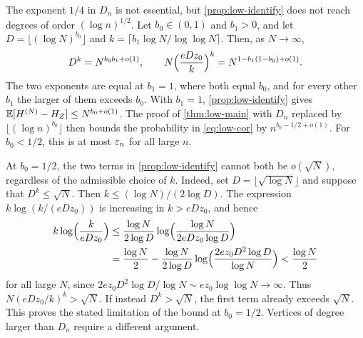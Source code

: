 \begin{remark}\label{rem:low-limit}
The exponent $1/4$ in $D_n$ is not essential, but \cref{prop:low-identify} does not reach degrees of order $(\log n)^{1/2}$. Let $b_0 \in (0, 1)$ and $b_1 > 0$, and let $D = \lfloor (\log N)^{b_0} \rfloor$ and $k = \lceil b_1 \log N/\log \log N \rceil$. Then, as $N \to \infty$,
\begin{equation*}
D^k = N^{b_0 b_1 + o(1)}, \qquad N \Bigl(\frac{e D z_0}{k}\Bigr)^k = N^{1 - b_1 (1 - b_0) + o(1)}.
\end{equation*}
The two exponents are equal at $b_1 = 1$, where both equal $b_0$, and for every other $b_1$ the larger of them exceeds $b_0$. With $b_1 = 1$, \cref{prop:low-identify} gives $\mathbb E[H^{(N)} - H_Z] \le N^{b_0 + o(1)}$. The proof of \cref{thm:low-main} with $D_n$ replaced by $\lfloor (\log n)^{b_0} \rfloor$ then bounds the probability in \eqref{eq:low-cor} by $n^{b_0 - 1/2 + o(1)}$. For $b_0 < 1/2$, this is at most $\varepsilon_n$ for all large $n$.

At $b_0 = 1/2$, the two terms in \cref{prop:low-identify} cannot both be $o(\sqrt N)$, regardless of the admissible choice of $k$. Indeed, set $D = \lfloor \sqrt{\log N} \rfloor$ and suppose that $D^k \le \sqrt N$. Then $k \le (\log N)/(2 \log D)$. The expression $k \log(k/(e D z_0))$ is increasing in $k > e D z_0$, and hence
\[
\begin{split}
k \log\Bigl(\frac{k}{e D z_0}\Bigr)
&\le \frac{\log N}{2 \log D}
\log\Bigl(\frac{\log N}{2 e D z_0 \log D}\Bigr) \\
&= \frac{\log N}{2}
- \frac{\log N}{2 \log D}
\log\Bigl(\frac{2 e z_0 D^2 \log D}{\log N}\Bigr)
< \frac{\log N}{2}
\end{split}
\]
for all large $N$, since $2 e z_0 D^2 \log D/\log N \sim e z_0 \log\log N \to \infty$. Thus $N(e D z_0/k)^k > \sqrt N$. If instead $D^k > \sqrt N$, the first term already exceeds $\sqrt N$. This proves the stated limitation of the bound at $b_0 = 1/2$. Vertices of degree larger than $D_n$ require a different argument.
\end{remark}
